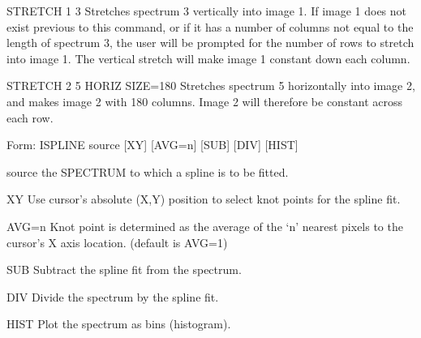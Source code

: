 {\newpage\clearpage
{}%
\begin{example}
  \item[STRETCH 1 3\hfill]{Stretches spectrum 3 vertically into image 1.
       If image 1 does not exist previous to this command, or if it has a
       number of columns not equal to the length of spectrum 3, the user
       will be prompted for the number of rows to stretch into image 1.
       The vertical stretch will make image 1 constant down each column.}
\par\item[STRETCH 2 5 HORIZ SIZE=180\hfill]{Stretches spectrum 5 horizontally
       into image 2, and makes image 2 with 180 columns.  Image 2 will
       therefore be constant across each row.}
\end{example}%
\lthtmlfigureZ
\lthtmlcheckvsize\clearpage}

{\newpage\clearpage
{}%
\begin{command} 
  \item[Form: ISPLINE source {[XY]} {[AVG=n]} {[SUB]} {[DIV]} {[HIST]}\hfill]{}
  \item[source]{the SPECTRUM to which a spline is to be fitted.}
  \item[XY]{Use cursor's absolute (X,Y) position to select
       knot points for the spline fit.}
  \item[AVG=n]{Knot point is determined as the average of the
       `n' nearest pixels to the cursor's X axis location. (default is AVG=1)}
  \item[SUB]{Subtract the spline fit from the spectrum.}
  \item[DIV]{Divide the spectrum by the spline fit.}
  \item[HIST]{Plot the spectrum as bins (histogram).}
\end{command}%
\lthtmlfigureZ
\lthtmlcheckvsize\clearpage}

